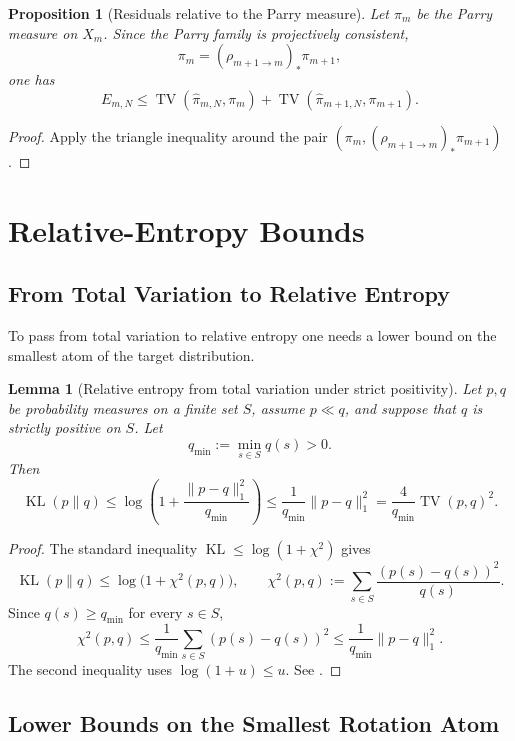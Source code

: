 \documentclass[11pt,letterpaper]{article}
\numberwithin{equation}{section}
\theoremstyle{plain}
\newtheorem{lemma}[theorem]{Lemma}
\newtheorem{proposition}[theorem]{Proposition}
\theoremstyle{definition}
\theoremstyle{remark}
\DeclareMathOperator{\TV}{TV}
\DeclareMathOperator{\KL}{KL}
\begin{document}
\begin{proposition}[Residuals relative to the Parry measure]\label{prop:multiscale-residual-parry-bound}
Let $\pi_m$ be the Parry measure on $X_m$.  Since the Parry family is
projectively consistent,
\[
\pi_m=(\rho_{m+1\to m})_*\pi_{m+1},
\]
one has
\[
E_{m,N}
\le
\TV(\hat\pi_{m,N},\pi_m)+\TV(\hat\pi_{m+1,N},\pi_{m+1}).
\]
\end{proposition}

\begin{proof}
Apply the triangle inequality around the pair
$(\pi_m,(\rho_{m+1\to m})_*\pi_{m+1})$.
\end{proof}

\section{Relative-Entropy Bounds}

\subsection{From Total Variation to Relative Entropy}

To pass from total variation to relative entropy one needs a lower bound on the
smallest atom of the target distribution.

\begin{lemma}[Relative entropy from total variation under strict positivity]\label{lem:kl-from-tv-qmin}
Let $p,q$ be probability measures on a finite set $S$, assume $p\ll q$, and
suppose that $q$ is strictly positive on $S$. Let
\[
q_{\min}:=\min_{s\in S}q(s)>0.
\]
Then
\[
\KL(p\|q)
\le
\log\!\left(1+\frac{\|p-q\|_1^2}{q_{\min}}\right)
\le
\frac{1}{q_{\min}}\|p-q\|_1^2
=
\frac{4}{q_{\min}}\TV(p,q)^2.
\]
\end{lemma}

\begin{proof}
The standard inequality \(\KL\le \log(1+\chi^2)\) gives
\[
\KL(p\|q)\le \log\bigl(1+\chi^2(p,q)\bigr),
\qquad
\chi^2(p,q):=\sum_{s\in S}\frac{(p(s)-q(s))^2}{q(s)}.
\]
Since \(q(s)\ge q_{\min}\) for every \(s\in S\),
\[
\chi^2(p,q)
\le
\frac{1}{q_{\min}}\sum_{s\in S}(p(s)-q(s))^2
\le
\frac{1}{q_{\min}}\|p-q\|_1^2.
\]
The second inequality uses \(\log(1+u)\le u\). See
\cite{SasonVerdu2016fDivergence}.
\end{proof}

\subsection{Lower Bounds on the Smallest Rotation Atom}
\end{document}
